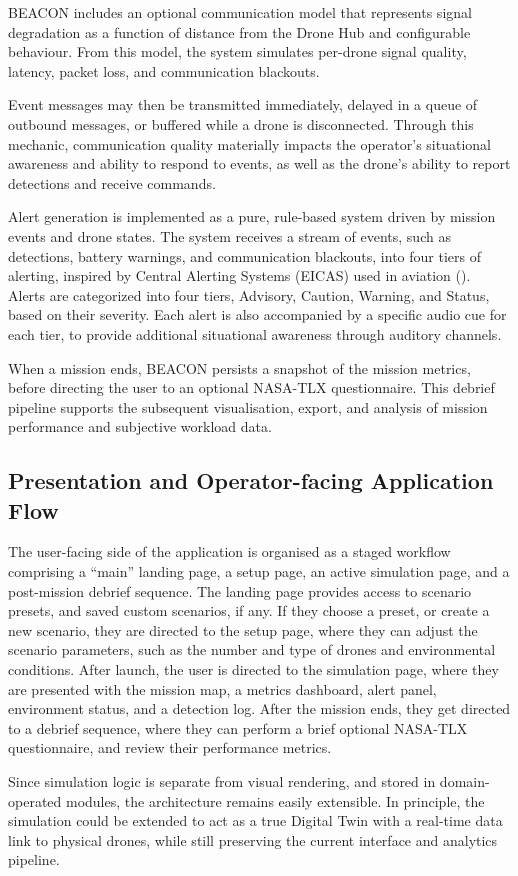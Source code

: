 BEACON includes an optional communication model that represents signal degradation as a function of distance from the Drone Hub and configurable behaviour.
From this model, the system simulates per-drone signal quality, latency, packet loss, and communication blackouts.

Event messages may then be transmitted immediately, delayed in a queue of outbound messages, or buffered while a drone is disconnected.
Through this mechanic, communication quality materially impacts the operator's situational awareness and ability to respond to events, as well as the drone's ability to report detections and receive commands.

Alert generation is implemented as a pure, rule-based system driven by mission events and drone states.
The system receives a stream of events, such as detections, battery warnings, and communication blackouts, into four tiers of alerting, inspired by Central Alerting Systems (EICAS) used in aviation (\cite{RN3}).
Alerts are categorized into four tiers, Advisory, Caution, Warning, and Status, based on their severity.
Each alert is also accompanied by a specific audio cue for each tier, to provide additional situational awareness through auditory channels.

When a mission ends, BEACON persists a snapshot of the mission metrics, before directing the user to an optional NASA-TLX questionnaire.
This debrief pipeline supports the subsequent visualisation, export, and analysis of mission performance and subjective workload data.

\subsection{Presentation and Operator-facing Application Flow}\label{subsec:presentation-and-operator-facing-application-flow}

The user-facing side of the application is organised as a staged workflow comprising a ``main'' landing page, a setup page, an active simulation page, and a post-mission debrief sequence.
The landing page provides access to scenario presets, and saved custom scenarios, if any.
If they choose a preset, or create a new scenario, they are directed to the setup page, where they can adjust the scenario parameters, such as the number and type of drones and environmental conditions.
After launch, the user is directed to the simulation page, where they are presented with the mission map, a metrics dashboard, alert panel, environment status, and a detection log.
After the mission ends, they get directed to a debrief sequence, where they can perform a brief optional NASA-TLX questionnaire, and review their performance metrics.

Since simulation logic is separate from visual rendering, and stored in domain-operated modules, the architecture remains easily extensible.
In principle, the simulation could be extended to act as a true Digital Twin with a real-time data link to physical drones, while still preserving the current interface and analytics pipeline.
